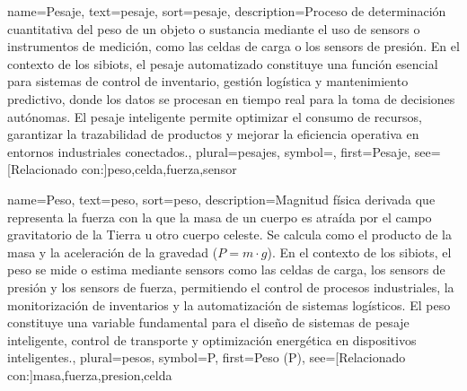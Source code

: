 	
	{
		name={Pesaje},
		text={pesaje},
		sort={pesaje},
		description={Proceso de determinaci{\'o}n cuantitativa del \gls{peso} de un objeto o sustancia mediante el uso de \glspl{sensor} o instrumentos de medici{\'o}n, como las \glspl{celda} de carga o los \glspl{sensor} de presi{\'o}n. 
			En el contexto de los \glspl{sibiot}, el pesaje automatizado constituye una funci{\'o}n esencial para sistemas de control de inventario, gesti{\'o}n log{\'i}stica y mantenimiento predictivo, donde los datos se procesan en tiempo real para la toma de decisiones aut{\'o}nomas. 
			El pesaje inteligente permite optimizar el consumo de recursos, garantizar la trazabilidad de productos y mejorar la eficiencia operativa en entornos industriales conectados.},
		plural={pesajes},
		symbol={},
		first={Pesaje},
		see=[Relacionado con:]{peso,celda,fuerza,sensor}
	}
	
	{
		name={Peso},
		text={peso},
		sort={peso},
		description={Magnitud f{\'i}sica derivada que representa la fuerza con la que la masa de un cuerpo es atra{\'i}da por el campo gravitatorio de la Tierra u otro cuerpo celeste. 
			Se calcula como el producto de la masa y la aceleraci{\'o}n de la gravedad (\ensuremath{P = m \cdot g}). 
			En el contexto de los \glspl{sibiot}, el peso se mide o estima mediante \glspl{sensor} como las \glspl{celda} de carga, los \glspl{sensor} de presi{\'o}n y los \glspl{sensor} de fuerza, permitiendo el control de procesos industriales, la monitorizaci{\'o}n de inventarios y la automatizaci{\'o}n de sistemas log{\'i}sticos. 
			El peso constituye una variable fundamental para el dise{\~n}o de sistemas de pesaje inteligente, control de transporte y optimizaci{\'o}n energ{\'e}tica en dispositivos inteligentes.},
		plural={pesos},
		symbol={P},
		first={Peso (P)},
		see=[Relacionado con:]{masa,fuerza,presion,celda}
	}
	
	
